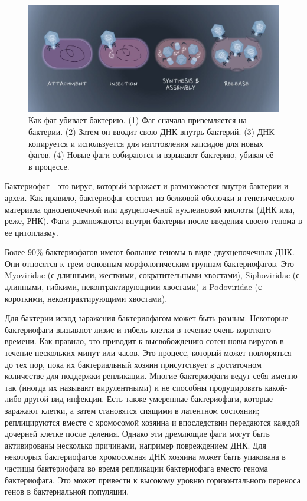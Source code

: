 \documentclass[14pt]{extarticle}
\begin{document}
    \begin{figure}[h]
        \centering
            \includegraphics[width=\textwidth]{img/average_phage.jpg}
        \caption{Как фаг убивает бактерию. (1) Фаг сначала приземляется на бактерии. (2) Затем он вводит свою ДНК внутрь
        бактерий. (3) ДНК копируется и используется для изготовления капсидов для новых фагов. (4) Новые фаги собираются
        и взрывают бактерию, убивая её в процессе. \cite{advdisphage}}
        \label{fig:skybox}
    \end{figure}
    
	\par{Бактериофаг - это вирус, который заражает и размножается внутри бактерии и археи. Как правило, бактериофаг 
	состоит из белковой оболочки и генетического материала одноцепочечной или двуцепочечной нуклеиновой кислоты (ДНК 
	или, реже, РНК). Фаги размножаются внутри бактерии после введения своего генома в ее цитоплазму. 
	\cite{phagewikieng,phagewikiru}}
	
	\par{Более 90\% бактериофагов имеют большие геномы в виде двухцепочечных ДНК. Они относятся к трем основным 
	морфологическим группам бактериофагов. Это Myoviridae (с длинными, жесткими, сократительными хвостами), Siphoviridae
	(с длинными, гибкими, неконтрактирующими хвостами) и Podoviridae (с короткими, неконтрактирующими хвостами). 
	\cite{phageapps}}
	
	\par{Для бактерии исход заражения бактериофагом может быть разным. Некоторые бактериофаги вызывают лизис и гибель 
	клетки в течение очень короткого времени. Как правило, это приводит к высвобождению сотен новы вирусов в течение 
	нескольких минут или часов. Это процесс, который может повторяться до тех пор, пока их бактериальный хозяин 
	присутствует в достаточном количестве для поддержки репликации. Многие бактериофаги ведут себя именно так (иногда их
	называют вирулентными) и не способны продуцировать какой-либо другой вид инфекции. Есть также умеренные 
	бактериофаги, которые заражают клетки, а затем становятся спящими в латентном состоянии; реплицируются вместе с 
	хромосомой хозяина и впоследствии передаются каждой дочерней клетке после деления. Однако эти дремлющие фаги могут 
	быть активированы несколько причинами, например повреждением ДНК. Для некоторых бактериофагов хромосомная ДНК 
	хозяина может быть упакована в частицы бактериофага во время репликации бактериофага вместо генома бактериофага. Это
	может привести к высокому уровню горизонтального переноса генов в бактериальной популяции.  \cite{phagetreat}}
    
\end{document}
